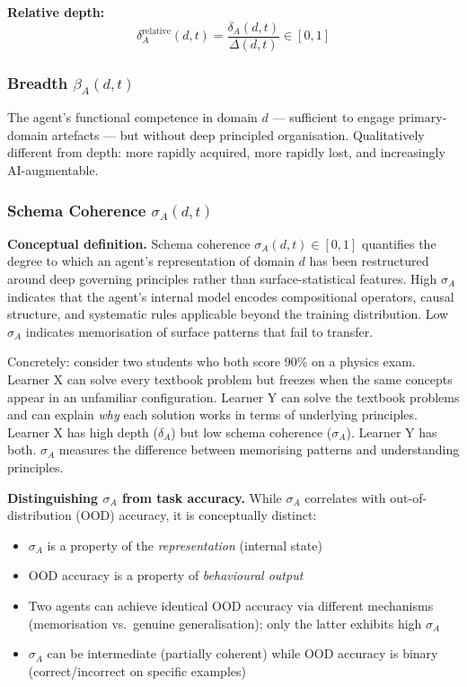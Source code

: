 \textbf{Relative depth:}
\begin{equation}\label{eq:relative-depth}
\delta_A^{\text{relative}}(d,t) = \frac{\delta_A(d,t)}{\Delta(d,t)} \in [0,1]
\end{equation}

\subsubsection{Breadth \texorpdfstring{$\beta_A(d,t)$}{beta\_A(d,t)}}\label{sec:breadth}

The agent's functional competence in domain $d$ --- sufficient to
engage primary-domain artefacts --- but without deep principled
organisation. Qualitatively different from depth: more rapidly acquired,
more rapidly lost, and increasingly AI-augmentable.

\subsubsection{Schema Coherence \texorpdfstring{$\sigma_A(d,t)$}{sigma\_A(d,t)}}\label{sec:schema-coherence}

\textbf{Conceptual definition.} Schema coherence $\sigma_A(d,t) \in [0,1]$
quantifies the degree to which an agent's representation of domain $d$
has been restructured around deep governing principles rather than
surface-statistical features. High $\sigma_A$ indicates that the agent's
internal model encodes compositional operators, causal structure, and
systematic rules applicable beyond the training distribution. Low
$\sigma_A$ indicates memorisation of surface patterns that fail to
transfer.

Concretely: consider two students who both score 90\% on a physics exam. Learner X can solve every textbook problem but freezes when the same concepts appear in an unfamiliar configuration. Learner Y can solve the textbook problems and can explain \emph{why} each solution works in terms of underlying principles. Learner X has high depth ($\delta_A$) but low schema coherence ($\sigma_A$). Learner Y has both. $\sigma_A$ measures the difference between memorising patterns and understanding principles.

\textbf{Distinguishing $\sigma_A$ from task accuracy.} While $\sigma_A$
correlates with out-of-distribution (OOD) accuracy, it is conceptually
distinct:
\begin{itemize}[nosep]
\item $\sigma_A$ is a property of the \textit{representation} (internal state)
\item OOD accuracy is a property of \textit{behavioural output}
\item Two agents can achieve identical OOD accuracy via different mechanisms (memorisation vs.\ genuine generalisation); only the latter exhibits high $\sigma_A$
\item $\sigma_A$ can be intermediate (partially coherent) while OOD accuracy is binary (correct/incorrect on specific examples)
\end{itemize}


